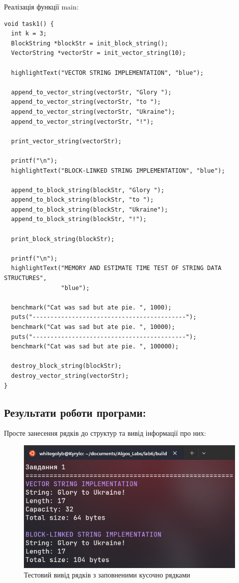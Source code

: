 Реалізація функції main:

\begin{lstlisting}[style=customc]
void task1() {
  int k = 3;
  BlockString *blockStr = init_block_string();
  VectorString *vectorStr = init_vector_string(10);

  highlightText("VECTOR STRING IMPLEMENTATION", "blue");

  append_to_vector_string(vectorStr, "Glory ");
  append_to_vector_string(vectorStr, "to ");
  append_to_vector_string(vectorStr, "Ukraine");
  append_to_vector_string(vectorStr, "!");

  print_vector_string(vectorStr);

  printf("\n");
  highlightText("BLOCK-LINKED STRING IMPLEMENTATION", "blue");

  append_to_block_string(blockStr, "Glory ");
  append_to_block_string(blockStr, "to ");
  append_to_block_string(blockStr, "Ukraine");
  append_to_block_string(blockStr, "!");

  print_block_string(blockStr);

  printf("\n");
  highlightText("MEMORY AND ESTIMATE TIME TEST OF STRING DATA STRUCTURES",
                "blue");

  benchmark("Cat was sad but ate pie. ", 1000);
  puts("-------------------------------------------");
  benchmark("Cat was sad but ate pie. ", 10000);
  puts("-------------------------------------------");
  benchmark("Cat was sad but ate pie. ", 100000);

  destroy_block_string(blockStr);
  destroy_vector_string(vectorStr);
}
\end{lstlisting}


\subsection{Результати роботи програми:}
Просте занесення рядків до структур та вивід інформації про них:

\begin{figure}[h!]
    \centering
    \includegraphics[width=15cm]{reports/algos/lab6/assets/1.png}
    \caption{Тестовий вивід рядків з заповненими кусочно рядками}
\end{figure}

